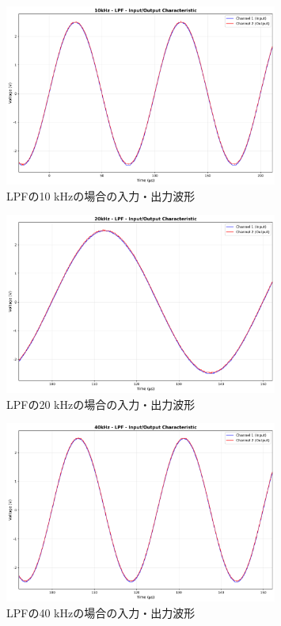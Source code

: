 \documentclass[11pt,dvipdfmx]{jarticle}
\begin{document}
\begin{figure}[H]
  \centering
  \includegraphics[width=0.8\textwidth]{graphs/10kHz_LPF_characteristic.png}
  \caption{LPFの10 kHzの場合の入力・出力波形}
  \label{fig:LPF_10kHz}
\end{figure}
\begin{figure}[H]
  \centering
  \includegraphics[width=0.8\textwidth]{graphs/20kHz_LPF_characteristic.png}
  \caption{LPFの20 kHzの場合の入力・出力波形}
  \label{fig:LPF_20kHz}
\end{figure}

\begin{figure}[H]
  \centering
  \includegraphics[width=0.8\textwidth]{graphs/40kHz_LPF_characteristic.png}
  \caption{LPFの40 kHzの場合の入力・出力波形}
  \label{fig:LPF_40kHz}
\end{figure}
\end{document}
